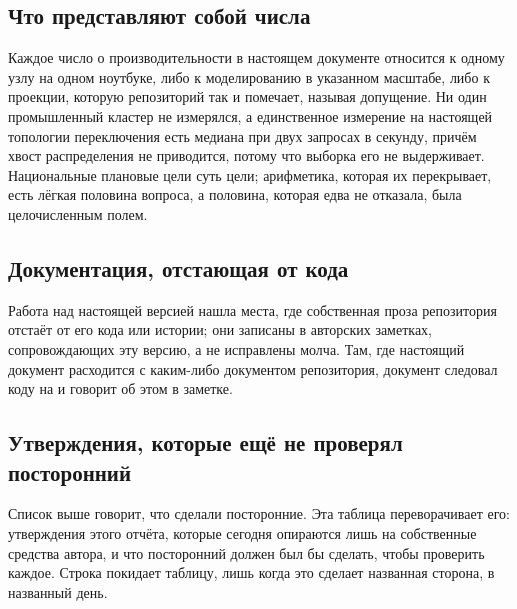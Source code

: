 \subsection{Что представляют собой числа}

Каждое число о производительности в настоящем документе относится к одному узлу на одном
ноутбуке, либо к моделированию в указанном масштабе, либо к проекции, которую репозиторий так и
помечает, называя допущение. Ни один промышленный кластер не измерялся, а единственное измерение
на настоящей топологии переключения есть медиана при двух запросах в секунду, причём хвост
распределения не приводится, потому что выборка его не выдерживает. Национальные плановые цели
суть цели; арифметика, которая их перекрывает, есть лёгкая половина вопроса, а половина, которая
едва не отказала, была целочисленным полем.

\subsection{Документация, отстающая от кода}

Работа над настоящей версией нашла места, где собственная проза репозитория отстаёт от его кода
или истории; они записаны в авторских заметках, сопровождающих эту версию, а не исправлены
молча. Там, где настоящий документ расходится с каким-либо документом
репозитория, документ следовал коду на  и говорит об этом в заметке.

\subsection{Утверждения, которые ещё не проверял посторонний}

Список выше говорит, что сделали посторонние. Эта таблица переворачивает его: утверждения этого
отчёта, которые сегодня опираются лишь на собственные средства автора, и что посторонний должен был
бы сделать, чтобы проверить каждое. Строка покидает таблицу, лишь когда это сделает названная
сторона, в названный день.

